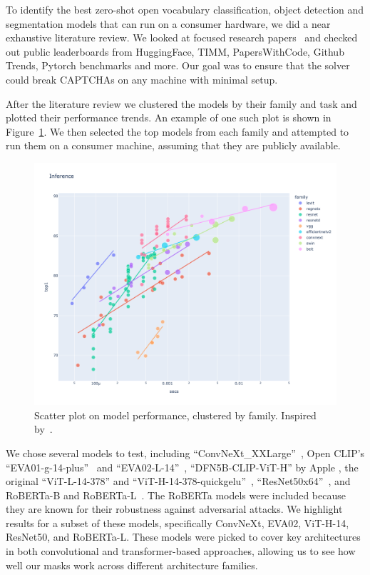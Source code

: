 \documentclass[a4paper, oneside]{discothesis}
\begin{document}
To identify the best zero-shot open vocabulary classification, object detection and segmentation models that can run on a consumer hardware, we did a near exhaustive literature review. We looked at focused research papers~\cite{wang2024benchmarking, goldblum2024battle} and checked out public leaderboards from HuggingFace, TIMM, PapersWithCode, Github Trends, Pytorch benchmarks and more. Our goal was to ensure that the solver could break CAPTCHAs on any machine with minimal setup.

After the literature review we clustered the models by their family and task and plotted their performance trends. An example of one such plot is shown in Figure~\ref{fig:families}. We then selected the top models from each family and attempted to run them on a consumer machine, assuming that they are publicly available.

\begin{figure}
	\centering
	\includegraphics[width=1\columnwidth]{figures/eval-families.png}
	\caption{Scatter plot on model performance, clustered by family. Inspired by~\cite{howard_image_models}.}
	\label{fig:families}
\end{figure}

We chose several models to test, including ``ConvNeXt\_XXLarge''~\cite{Liu_2022_CVPR}, Open CLIP's ``EVA01-g-14-plus''~\cite{Fang_2023_CVPR} and ``EVA02-L-14''~\cite{fang2024eva}, ``DFN5B-CLIP-ViT-H'' by Apple \cite{fang2023data}, the original ``ViT-L-14-378'' and ``ViT-H-14-378-quickgelu''~\cite{dosovitskiy2021imageworth16x16words}, ``ResNet50x64''~\cite{He_2015_ICCV}, and RoBERTa-B and RoBERTa-L~\cite{conneau2020unsupervisedcrosslingualrepresentationlearning}. The RoBERTa models were included because they are known for their robustness against adversarial attacks. We highlight results for a subset of these models, specifically ConvNeXt, EVA02, ViT-H-14, ResNet50, and RoBERTa-L. These models were picked to cover key architectures in both convolutional and transformer-based approaches, allowing us to see how well our masks work across different architecture families.
\end{document}
